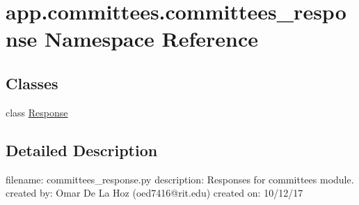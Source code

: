 \hypertarget{namespaceapp_1_1committees_1_1committees__response}{}\section{app.\+committees.\+committees\+\_\+response Namespace Reference}
\label{namespaceapp_1_1committees_1_1committees__response}
\subsection*{Classes}
\begin{DoxyCompactItemize}
\item 
class \mbox{\hyperlink{classapp_1_1committees_1_1committees__response_1_1_response}{Response}}
\end{DoxyCompactItemize}


\subsection{Detailed Description}
\begin{DoxyVerb}filename: committees_response.py
description: Responses for committees module.
created by: Omar De La Hoz (oed7416@rit.edu)
created on: 10/12/17
\end{DoxyVerb}
 
